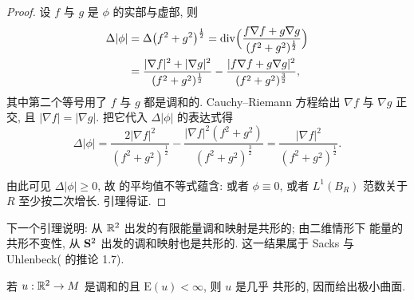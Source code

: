 \begin{proof}
设 $f$ 与 $g$ 是 $\phi$ 的实部与虚部, 则
\begin{equation}
\begin{aligned}
\Delta|\phi|&=\Delta\bigl(f^2+g^2\bigr)^{\frac12}
 =\operatorname{div}\Bigl(\frac{f\nabla f+g\nabla g}{(f^2+g^2)^{\frac12}}\Bigr)\\
&=\frac{|\nabla f|^2+|\nabla g|^2}{(f^2+g^2)^{\frac12}}
 -\frac{|f\nabla f+g\nabla g|^2}{(f^2+g^2)^{\frac32}},
\end{aligned}
\label{eq:4.52}
\end{equation}
其中第二个等号用了 $f$ 与 $g$ 都是调和的. Cauchy--Riemann 方程给出
$\nabla f$ 与 $\nabla g$ 正交, 且 $|\nabla f|=|\nabla g|$. 把它代入
$\Delta|\phi|$ 的表达式得
\begin{equation}
\Delta|\phi|
 =\frac{2|\nabla f|^2}{(f^2+g^2)^{\frac12}}
 -\frac{|\nabla f|^2(f^2+g^2)}{(f^2+g^2)^{\frac32}}
 =\frac{|\nabla f|^2}{(f^2+g^2)^{\frac12}}.
\label{eq:4.53}
\end{equation}

由此可见 $\Delta|\phi|\geq0$, 故 的平均值不等式蕴含: 或者
$\phi\equiv0$, 或者 $L^1(B_R)$ 范数关于 $R$ 至少按二次增长. 引理得证.
\end{proof}

下一个引理说明: 从 $\mathbb{R}^2$ 出发的有限能量调和映射是共形的; 由二维情形下
能量的共形不变性, 从 $\mathbf{S}^2$ 出发的调和映射也是共形的. 这一结果属于
Sacks 与 Uhlenbeck(\cite{SaUh} 的推论 1.7).

\begin{lemma}
\label{lem:4.25}
若 $u:\mathbb{R}^2\to M$ 是调和的且 $\mathrm{E}(u)<\infty$, 则 $u$ 是几乎
共形的, 因而给出极小曲面.
\end{lemma}

